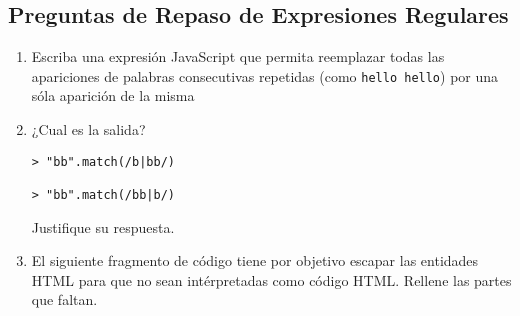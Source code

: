 \subsection{Preguntas de Repaso de Expresiones
Regulares}\label{preguntas-de-repaso-de-expresiones-regulares}

\begin{enumerate}
\def\labelenumi{\arabic{enumi}.}
\item
  Escriba una expresión JavaScript que permita reemplazar todas las
  apariciones de palabras consecutivas repetidas (como
  \texttt{hello hello}) por una sóla aparición de la misma
\item
  ¿Cual es la salida?

\begin{verbatim}
> "bb".match(/b|bb/)

> "bb".match(/bb|b/)
\end{verbatim}

  Justifique su respuesta.
\item
  El siguiente fragmento de código tiene por objetivo escapar las
  entidades HTML para que no sean intérpretadas como código HTML.
  Rellene las partes que faltan.
\end{enumerate}

\begin{Shaded}
\begin{Highlighting}[]
 
    \NormalTok{: }\NormalTok{,}
    \NormalTok{: }\NormalTok{,}
    \NormalTok{: }\NormalTok{,}
    \NormalTok{: }\NormalTok{,}
    \NormalTok{: }\NormalTok{,}
    \NormalTok{: }
  \NormalTok{\};}

 
   \NormalTok{(}\NormalTok{, } 
     \NormalTok{____________;}
  \NormalTok{\});}
\end{Highlighting}
\end{Shaded}

